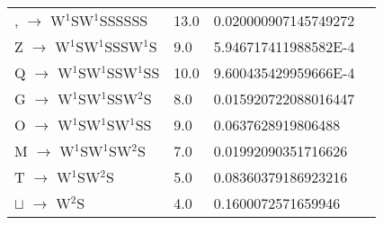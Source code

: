 \documentclass[12pt]{article}
\begin{document}
\begin{tabular}{l l l l}
, $\rightarrow$ W{$^{1}$}SW{$^{1}$}SSSSSS	&	13.0	&	0.020000907145749272\\
Z $\rightarrow$ W{$^{1}$}SW{$^{1}$}SSSW{$^{1}$}S	&	9.0	&	5.946717411988582E-4\\
Q $\rightarrow$ W{$^{1}$}SW{$^{1}$}SSW{$^{1}$}SS	&	10.0	&	9.600435429959666E-4\\
G $\rightarrow$ W{$^{1}$}SW{$^{1}$}SSW{$^{2}$}S	&	8.0	&	0.015920722088016447\\
O $\rightarrow$ W{$^{1}$}SW{$^{1}$}SW{$^{1}$}SS	&	9.0	&	0.0637628919806488\\
M $\rightarrow$ W{$^{1}$}SW{$^{1}$}SW{$^{2}$}S	&	7.0	&	0.01992090351716626\\
T $\rightarrow$ W{$^{1}$}SW{$^{2}$}S	&	5.0	&	0.08360379186923216\\
$\sqcup$ $\rightarrow$ W{$^{2}$}S	&	4.0	&	0.1600072571659946\\
\end{tabular}
\end{document}
